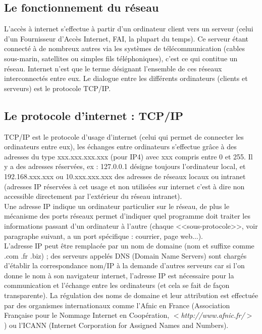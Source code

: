 \documentclass[11pt,twoside,a4paper]{article}
\begin{document}
	\subsection{Le fonctionnement du r{\'e}seau}
			L'acc{\`e}s {\`a} internet s'effectue {\`a} partir d'un ordinateur client vers un serveur (celui d'un Fournisseur d'Acc{\`e}s Internet, FAI, la plupart du temps). Ce serveur {\'e}tant connect{\'e} {\`a} de nombreux autres via les syst{\`e}mes de t{\'e}l{\'e}communication (cables sous-marin, satellites ou simples fils t{\'e}l{\'e}phoniques), c'est ce qui contitue un r{\'e}seau. Internet n'est que le terme d{\'e}signant l'ensemble de ces r{\'e}seaux interconnect{\'e}s entre eux. Le dialogue entre les diff{\'e}rents ordinateurs (clients et serveurs) est le protocole TCP/IP.

	\subsection{Le protocole d'internet : TCP/IP}
			
			TCP/IP est le protocole d'usage d'internet (celui qui permet de connecter les ordinateurs entre eux), les {\'e}changes entre ordinateurs s'effectue gr{\^a}ce {\`a} des adresses du type xxx.xxx.xxx.xxx (pour IP4) avec xxx compris entre 0 et 255. Il y a des adresses r{\'e}serv{\'e}es, ex : 127.0.0.1 d{\'e}signe toujours l'ordinateur local, et 192.168.xxx.xxx ou 10.xxx.xxx.xxx des adresses de r{\'e}seaux locaux ou intranet (adresses IP r{\'e}serv{\'e}es {\`a} cet usage et non utilis{\'e}es sur internet c'est {\`a} dire non accessible directement par l'ext{\'e}rieur du r{\'e}seau intranet).~\\

			Une adresse IP indique un ordinateur particulier sur le r{\'e}seau, de plus le m{\'e}canisme des ports r{\'e}seaux permet d'indiquer quel programme doit traiter les informations passant d'un ordinateur {\`a} l'autre (chaque <<sous-protocole>>, voir paragraphe suivant, a un port sp{\'e}cifique : courrier, page web...). ~\\

			L'adresse IP peut {\^e}tre remplac{\'e}e par un nom de domaine (nom et suffixe comme .com .fr .biz) ; des serveurs appel{\'e}s DNS (Domain Name Servers) sont charg{\'e}s d'{\'e}tablir la correspondance nom/IP {\`a} la demande d'autres serveurs car si l'on donne le nom {\`a} son navigateur internet, l'adresse IP est n{\'e}cessaire pour la communication et l'{\'e}change entre les ordinateurs (et cela se fait de fa\c{c}on transparente). La r{\'e}gulation des noms de domaine et leur attribution est effectu{\'e}e par des organismes internationaux comme l'Afnic en France (Association Fran\c{c}aise pour le Nommage Internet en Coop{\'e}ration, $<$\emph{http://www.afnic.fr/}$>$ ) ou l'ICANN (Internet Corporation for Assigned Names and Numbers).
\end{document}
